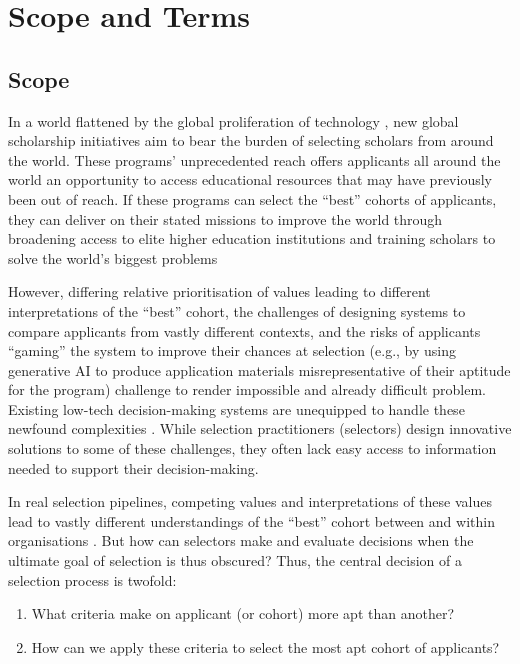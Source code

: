 \section{Scope and Terms}
\subsection{Scope}
In a world flattened by the global proliferation of technology \cite{Friedman_2005}, new global scholarship initiatives aim to bear the burden of selecting scholars from around the world. These programs' unprecedented reach offers applicants all around the world an opportunity to access educational resources that may have previously been out of reach. If these programs can select the ``best'' cohorts of applicants, they can deliver on their stated missions to improve the world through broadening access to elite higher education institutions and training scholars to solve the world's biggest problems

However, differing relative prioritisation of values leading to different interpretations of the ``best'' cohort, the challenges of designing systems to compare applicants from vastly different contexts, and the risks of applicants ``gaming'' the system to improve their chances at selection (e.g., by using generative AI to produce application materials misrepresentative of their aptitude for the program) challenge to render impossible and already difficult problem. Existing low-tech decision-making systems are unequipped to handle these newfound complexities \cite{Latzer_Hollnbuchner_Just_Saurwein_2014}. While selection practitioners (selectors) design innovative solutions to some of these challenges, they often lack easy access to information needed to support their decision-making.

In real selection pipelines, competing values and interpretations of these values lead to vastly different understandings of the ``best'' cohort between and within organisations \cite{zimmerman_research_2014}. But how can selectors make and evaluate decisions when the ultimate goal of selection is thus obscured? Thus, the central decision of a selection process is twofold: 

\begin{enumerate}
    \item What criteria make on applicant (or cohort) more apt than another?
    \item How can we apply these criteria to select the most apt cohort of applicants?
\end{enumerate}

